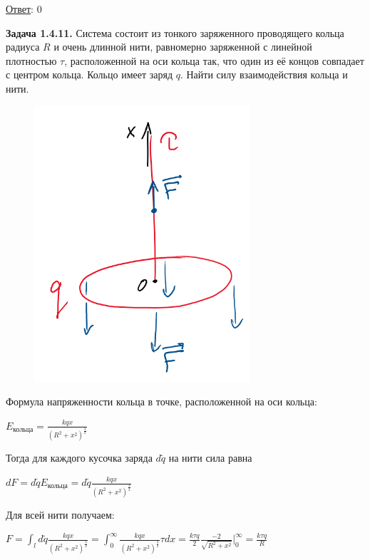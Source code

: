 \underline{Ответ}: 0

\clearpage

\begin{tcolorbox}
    \textbf{Задача 1.4.11.} Система состоит из тонкого заряженного
    проводящего кольца радиуса $R$ и очень длинной нити, равномерно
    заряженной с линейной плотностью $\tau$, расположенной на оси
    кольца так, что один из её концов совпадает с центром кольца.
    Кольцо имеет заряд $q$. Найти силу взаимодействия кольца и нити.
\end{tcolorbox}

\begin{minipage}{\textwidth}
    \begin{figure}
        \includegraphics[width=8cm]{physics1/images/physics1_homework_6_3}
    \end{figure}

    Формула напряженности кольца в точке, расположенной на оси кольца: 

    $E_{\text{кольца}} = \frac{kqx}{(R^2 + x^2)^{\frac{3}{2}}}$

    Тогда для каждого кусочка заряда $d\tilde{q}$ на нити сила равна

    $dF = d\tilde{q} E_{\text{кольца}} = d\tilde{q} \frac{kqx}{(R^2 + x^2)^{\frac{3}{2}}}$

    Для всей нити получаем: 

    $F = \int_l d\tilde{q} \frac{kqx}{(R^2 + x^2)^{\frac{3}{2}}} = \int_0^\infty \frac{kqx}{(R^2 + x^2)^{\frac{3}{2}}} \tau dx = 
    \frac{k\tau q}{2} \frac{-2}{\sqrt{R^2 + x^2}} \Big|_0^\infty = \frac{k\tau q}{R}$
\end{minipage}

